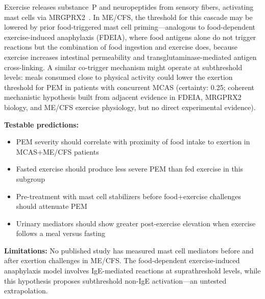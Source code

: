 \begin{speculation}
\label{spec:pem-food-mast}
Exercise releases substance~P and neuropeptides from sensory fibers, activating mast cells via MRGPRX2~\cite{Roy2021mrgprx2,Thapaliya2022mrgprx2neuro}. In ME/CFS, the threshold for this cascade may be lowered by prior food-triggered mast cell priming---analogous to food-dependent exercise-induced anaphylaxis (FDEIA), where food antigens alone do not trigger reactions but the combination of food ingestion and exercise does, because exercise increases intestinal permeability and transglutaminase-mediated antigen cross-linking. A similar co-trigger mechanism might operate at subthreshold levels: meals consumed close to physical activity could lower the exertion threshold for PEM in patients with concurrent MCAS (certainty: 0.25; coherent mechanistic hypothesis built from adjacent evidence in FDEIA, MRGPRX2 biology, and ME/CFS exercise physiology, but no direct experimental evidence).

\textbf{Testable predictions:}
\begin{itemize}
    \item PEM severity should correlate with proximity of food intake to exertion in MCAS+ME/CFS patients
    \item Fasted exercise should produce less severe PEM than fed exercise in this subgroup
    \item Pre-treatment with mast cell stabilizers before food+exercise challenges should attenuate PEM
    \item Urinary mediators should show greater post-exercise elevation when exercise follows a meal versus fasting
\end{itemize}

\textbf{Limitations:} No published study has measured mast cell mediators before and after exertion challenges in ME/CFS. The food-dependent exercise-induced anaphylaxis model involves IgE-mediated reactions at suprathreshold levels, while this hypothesis proposes subthreshold non-IgE activation---an untested extrapolation.
\end{speculation}

